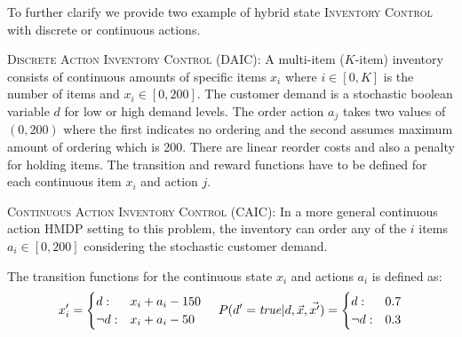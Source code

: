 \documentclass[twoside,11pt]{article}
\newcommand{\InventoryControl}{\textsc{Inventory Control }}
\begin{document}
To further clarify we provide two example of hybrid state \InventoryControl with discrete or continuous actions.
\vspace{2mm}

\textsc{Discrete Action} \InventoryControl (\textsc{DAIC}): 
A multi-item ($K$-item) inventory consists of continuous amounts of specific items $x_i$ where $i \in [0,K]$ is the number of items and $x_i \in [0,200]$. The customer demand is a stochastic boolean variable $d$ for low or high demand levels.  The order action $a_j$ takes two values of $(0,200)$ where the first indicates no ordering and the second assumes maximum amount of ordering which is 200. There are linear reorder costs and also a penalty for holding items. The transition and reward functions have to be defined for each continuous item $x_i$ and action $j$.

\vspace{2mm}
\textsc{Continuous Action}  \InventoryControl (\textsc{CAIC}):
In a more general  continuous action HMDP setting to this problem, the inventory can order  any of the $i$ items $a_i \in [0,200]$ considering the stochastic customer demand. 

The transition functions for the continuous state $x_i$ and actions $a_i$ is defined as: 
{%
\vspace{-2mm}
\begin{align}
x'_i= \begin{cases}
d  : & x_i + a_i - 150 \\
\neg d : & x_i + a_i - 50    
\end{cases} 
\hspace{4mm}
 P(d'=\mathit{true}|d,\vec{x},\vec{x'})=  \begin{cases}
d     :& 0.7\\
\neg d : & 0.3	\\
\end{cases} \label{eq:trans_inv}
\end{align}
\vspace{-2mm}}
\end{document}
